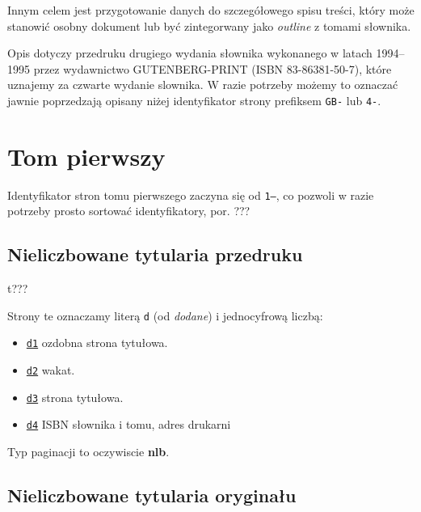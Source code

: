 \documentclass[12]{mwart}
\begin{document}
Innym celem jest przygotowanie danych do szczegółowego spisu treści,
który może stanowić osobny dokument lub być zintegorwany jako
\textit{outline} z tomami słownika.

Opis dotyczy przedruku drugiego wydania słownika wykonanego w latach
1994--1995 przez wydawnictwo GUTENBERG-PRINT (ISBN 83-86381-50-7),
które uznajemy za czwarte wydanie slownika. W razie potrzeby możemy to
oznaczać jawnie poprzedzają opisany niżej identyfikator strony
prefiksem \texttt{GB-} lub \texttt{4-}.


\section{Tom pierwszy}

Identyfikator stron tomu pierwszego zaczyna się od \texttt{1---}, co
pozwoli w razie potrzeby prosto sortować identyfikatory, por. ???

\subsection{Nieliczbowane tytularia przedruku}
\label{sec:niel-tytul-przedr}

\newcommand{\pai}[2]{http://teksty.klf.uw.edu.pl/20/2/LindeIIGP#1ocri.djvu?djvuopts=\&page=#2\&zoom=page}


t???

Strony te oznaczamy literą \texttt{d} (od \textit{dodane}) i
jednocyfrową liczbą:
\begin{itemize}
\item \href{\pai{1}{1}}{\texttt{d1}} ozdobna strona tytułowa.
\item \href{\pai{1}{2}}{\texttt{d2}} wakat.
\item \href{\pai{1}{3}}{\texttt{d3}} strona tytułowa.
\item \href{\pai{1}{4}}{\texttt{d4}} ISBN słownika i tomu, adres drukarni
\end{itemize}

Typ paginacji to oczywiscie \textbf{nlb}.

\subsection{Nieliczbowane tytularia oryginału}
\label{sec:tytularia-oryginau}
\end{document}
